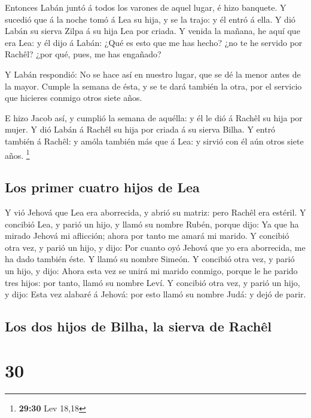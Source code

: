 Entonces Labán juntó á todos los varones de aquel lugar, é
hizo banquete.  Y sucedió que á la noche tomó á Lea su
hija, y se la trajo: y él entró á ella.  Y dió Labán su
sierva Zilpa á su hija Lea por criada.  Y venida la mañana,
he aquí que era Lea: y él dijo á Labán: ¿Qué es esto que me has hecho?
¿no te he servido por Rachêl? ¿por qué, pues, me has engañado?

 Y Labán respondió: No se hace así en nuestro lugar, que se
dé la menor antes de la mayor.  Cumple la semana de ésta, y
se te dará también la otra, por el servicio que hicieres conmigo otros
siete años.

 E hizo Jacob así, y cumplió la semana de aquélla: y él le
dió á Rachêl su hija por mujer.  Y dió Labán á Rachêl su
hija por criada á su sierva Bilha.  Y entró también á
Rachêl: y amóla también más que á Lea: y sirvió con él aún otros siete
años. \footnote{\textbf{29:30} Lev 18,18}

\hypertarget{los-primer-cuatro-hijos-de-lea}{%
\subsection{Los primer cuatro hijos de
Lea}\label{los-primer-cuatro-hijos-de-lea}}

 Y vió Jehová que Lea era aborrecida, y abrió su matriz:
pero Rachêl era estéril.  Y concibió Lea, y parió un hijo,
y llamó su nombre Rubén, porque dijo: Ya que ha mirado Jehová mi
aflicción; ahora por tanto me amará mi marido.  Y concibió
otra vez, y parió un hijo, y dijo: Por cuanto oyó Jehová que yo era
aborrecida, me ha dado también éste. Y llamó su nombre Simeón.
 Y concibió otra vez, y parió un hijo, y dijo: Ahora esta
vez se unirá mi marido conmigo, porque le he parido tres hijos: por
tanto, llamó su nombre Leví.  Y concibió otra vez, y parió
un hijo, y dijo: Esta vez alabaré á Jehová: por esto llamó su nombre
Judá: y dejó de parir.

\hypertarget{los-dos-hijos-de-bilha-la-sierva-de-rachuxeal}{%
\subsection{Los dos hijos de Bilha, la sierva de
Rachêl}\label{los-dos-hijos-de-bilha-la-sierva-de-rachuxeal}}

\hypertarget{section-29}{%
\section{30}\label{section-29}}

